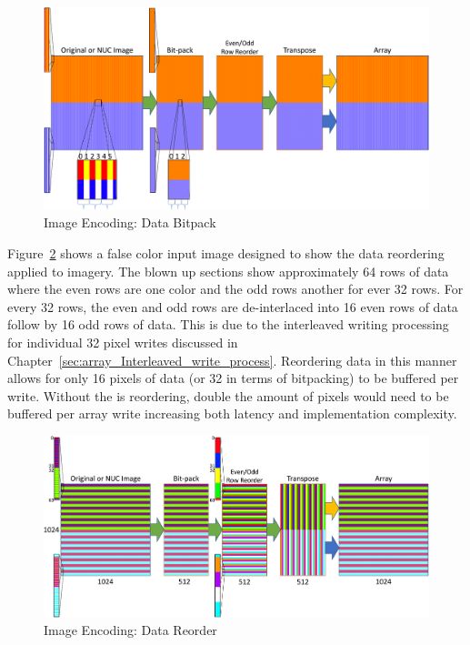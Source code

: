     \begin{figure}
        \centering
        \includegraphics[trim=0in 0in 0in 0in,width=1.0\textwidth]{fig/image_encoding_bitback.pdf}
        \caption{Image Encoding: Data Bitpack}
        \label{fig:image_encoding_bitback}
    \end{figure}

    Figure~\ref{fig:image_encoding_bitpack_reorder} shows a false color input image designed to show the data reordering applied to imagery. The blown up sections show approximately 64 rows of data where the even rows are one color and the odd rows another for ever 32 rows. For every 32 rows, the even and odd rows are de-interlaced into 16 even rows of data follow by 16 odd rows of data. This is due to the interleaved writing processing for individual 32 pixel writes discussed in Chapter~\ref{sec:array_Interleaved_write_process}. Reordering data in this manner allows for only 16 pixels of data (or 32 in terms of bitpacking) to be buffered per write. Without the is reordering, double the amount of pixels would need to be buffered per array write increasing both latency and implementation complexity.

    \begin{figure}
        \centering
        \includegraphics[trim=0in 0in 0in 0in,width=1.0\textwidth]{fig/image_encoding_reorder.pdf}
        \caption{Image Encoding: Data Reorder}
        \label{fig:image_encoding_bitpack_reorder}
    \end{figure}

